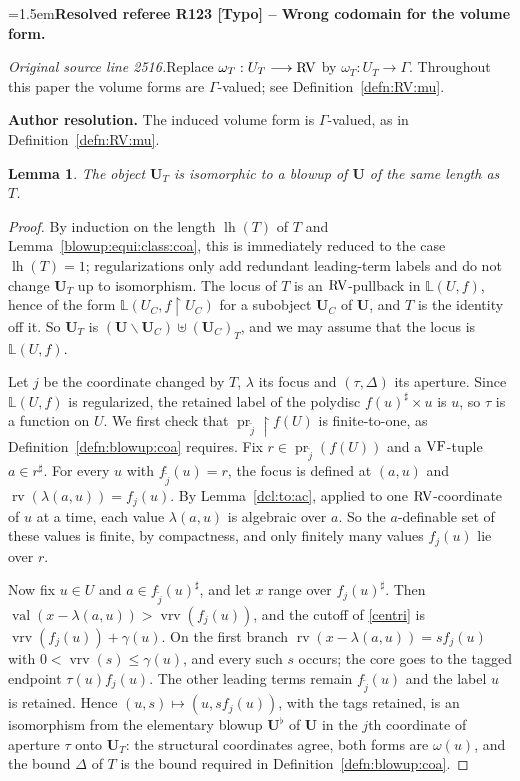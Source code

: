 \documentclass[12pt]{amsart}
\newcommand{\ResolvedRefereeRemark}[5]{%
  \par\medskip\begingroup\normalfont\small\color{gray}%
  \emergencystretch=1.5em\noindent\textbf{Resolved referee R#1 [#2] -- #3.}\par\nobreak\noindent #4\par
  \medskip\color{ResolutionGreen}\noindent\textbf{Author resolution.} #5\par
  \endgroup\medskip
}
\theoremstyle{plain}
\newtheorem{lem}[thm]{Lemma}
\theoremstyle{definition}
\theoremstyle{remark}
\numberwithin{equation}{section}
\theoremstyle{plain}
\newcommand{\VF}{\textup{VF}}
\newcommand{\RV}{\textup{RV}}
\DeclareMathOperator{\lh}{lh}
\DeclareMathOperator{\pr}{pr}
\newcommand{\0}{\emptyset}
\newcommand{\bb}[1]{\mathbb{#1}}
\newcommand{\rest}{\upharpoonright}
\newcommand{\efun}{\longmapsto}
\newcommand{\mi}{\smallsetminus}
\DeclareMathOperator{\rv}{rv}
\DeclareMathOperator{\vv}{val}
\DeclareMathOperator{\vrv}{vrv}
\begin{document}
\ResolvedRefereeRemark{123}{Typo}{Wrong codomain for the volume form}{%
\textit{Original source line 2516.}\quad Replace $\omega_T:U_T\longrightarrow\RV$ by $\omega_T:U_T\longrightarrow\Gamma$. Throughout this paper the volume forms are $\Gamma$-valued; see Definition~\ref{defn:RV:mu}.
}{The induced volume form is $\Gamma$-valued, as in Definition~\ref{defn:RV:mu}.}


\begin{lem}\label{special:to:blowup:coa}
The object $\bm U_T$ is isomorphic to a blowup of $\bm U$ of the same length as $T$.
\end{lem}
\begin{proof}
By induction on the length $\lh (T)$ of $T$ and Lemma~\ref{blowup:equi:class:coa}, this is immediately reduced to the case $\lh (T) = 1$; regularizations only add redundant leading-term labels and do not change $\bm U_T$ up to isomorphism. The locus of $T$ is an $\RV$-pullback in $\bb L(U, f)$, hence of the form $\bb L(U_C, f \rest U_C)$ for a subobject $\bm U_C$ of $\bm U$, and $T$ is the identity off it. So $\bm U_T$ is $(\bm U \mi \bm U_C) \uplus (\bm U_C)_T$, and we may assume that the locus is $\bb L(U, f)$.

Let $j$ be the coordinate changed by $T$, $\lambda$ its focus and $(\tau, \Delta)$ its aperture. Since $\bb L(U, f)$ is regularized, the retained label of the polydisc $f(u)^\sharp \times u$ is $u$, so $\tau$ is a function on $U$. We first check that $\pr_{\tilde j} \rest f(U)$ is finite-to-one, as Definition~\ref{defn:blowup:coa} requires. Fix $r \in \pr_{\tilde j}(f(U))$ and a $\VF$-tuple $a \in r^\sharp$. For every $u$ with $f_{\tilde j}(u) = r$, the focus is defined at $(a, u)$ and $\rv(\lambda(a, u)) = f_j(u)$. By Lemma~\ref{dcl:to:ac}, applied to one $\RV$-coordinate of $u$ at a time, each value $\lambda(a, u)$ is algebraic over $a$. So the $a$-definable set of these values is finite, by compactness, and only finitely many values $f_j(u)$ lie over $r$.

Now fix $u \in U$ and $a \in f_{\tilde j}(u)^\sharp$, and let $x$ range over $f_j(u)^\sharp$. Then $\vv(x - \lambda(a, u)) > \vrv(f_j(u))$, and the cutoff of \eqref{centri} is $\vrv(f_j(u)) + \gamma(u)$. On the first branch $\rv(x - \lambda(a, u)) = s f_j(u)$ with $0 < \vrv(s) \leq \gamma(u)$, and every such $s$ occurs; the core goes to the tagged endpoint $\tau(u) f_j(u)$. The other leading terms remain $f_{\tilde j}(u)$ and the label $u$ is retained. Hence $(u, s) \efun (u, s f_j(u))$, with the tags retained, is an isomorphism from the elementary blowup $\bm U^\flat$ of $\bm U$ in the $j$th coordinate of aperture $\tau$ onto $\bm U_T$: the structural coordinates agree, both forms are $\omega(u)$, and the bound $\Delta$ of $T$ is the bound required in Definition~\ref{defn:blowup:coa}.


\end{proof}
\end{document}
